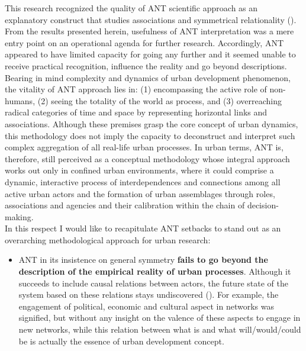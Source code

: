 \documentclass[11pt]{report}
\begin{document}
{This research recognized the quality of ANT scientific approach as an explanatory construct that studies associations and symmetrical relationality (\href{ref}{\citealt{farias_urban_2011}}).
From the results presented herein, usefulness of ANT interpretation was a mere entry point on an operational agenda for further research.
Accordingly, ANT appeared to have limited capacity for going any further and it seemed unable to receive practical recognition, influence the reality and go beyond descriptions.
\\

Bearing in mind complexity and dynamics of urban development phenomenon, the vitality of ANT approach lies in: (1) encompassing the active role of non-humans, (2) seeing the totality of the world as process, and (3) overreaching radical categories of time and space by representing horizontal links and associations.
Although these premises grasp the core concept of urban dynamics, this methodology does not imply the capacity to deconstruct and interpret such complex aggregation of all real-life urban processes.
In urban terms, ANT is, therefore, still perceived as a conceptual methodology whose integral approach works out only in confined urban environments, where it could comprise a dynamic, interactive process of interdependences and connections among all active urban actors and the formation of urban assemblages through roles, associations and agencies and their calibration within the chain of decision-making.
\\
In this respect I would like to recapitulate ANT setbacks to stand out as an overarching methodological approach for urban research:

\begin{itemize}
\item ANT in its insistence on general symmetry \textbf{fails to go beyond the description of the empirical reality of urban processes}. Although it succeeds to include causal relations between actors, the future state of the system based on these relations stays undiscovered (\href{ref}{\citealt{elder-vass_searching_2008}}). For example, the engagement of political, economic and cultural aspect in networks was signified, but without any insight on the valence of these aspects to engage in new networks, while this relation between what is and what will/would/could be is actually the essence of urban development concept.


\end{itemize}}
\end{document}
